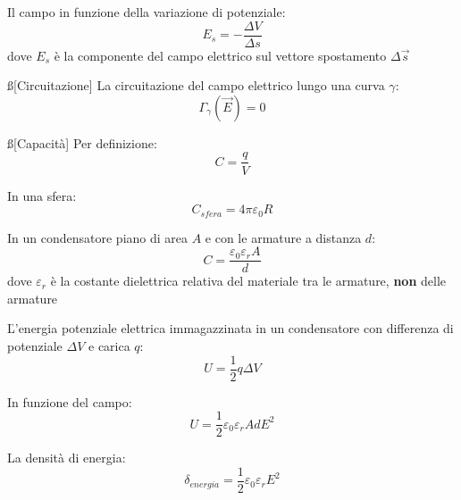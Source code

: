 \documentclass[12pt]{article}
\begin{document}
Il campo in funzione della variazione di potenziale:
$$ E_s = -\frac{\Delta V}{\Delta s} $$
dove $E_s$ è la componente del campo elettrico sul vettore spostamento $\Delta \vec{s}$

\ss[Circuitazione]
La circuitazione del campo elettrico lungo una curva $\gamma$:
$$ \Gamma_{\gamma}(\vec{E}) = 0 $$

\ss[Capacità]
Per definizione:
$$ C = \frac{q}{V} $$

In una sfera:
$$ C_{sfera} = 4\pi\varepsilon_0 R $$

In un condensatore piano di area $A$ e con le armature a distanza $d$:
$$ C = \frac{\varepsilon_0 \varepsilon_r A}{d} $$
dove $\varepsilon_r$ è la costante dielettrica relativa del materiale tra le armature, \textbf{non} delle armature

\v

L'energia potenziale elettrica immagazzinata in un condensatore con differenza di potenziale $\Delta V$ e carica $q$:
$$ U = \frac{1}{2}q \Delta V $$

In funzione del campo:
$$ U = \frac{1}{2} \varepsilon_0 \varepsilon_r AdE^2 $$

La densità di energia:
$$ \delta_{energia} = \frac{1}{2} \varepsilon_0 \varepsilon_r E^2 $$
\end{document}
